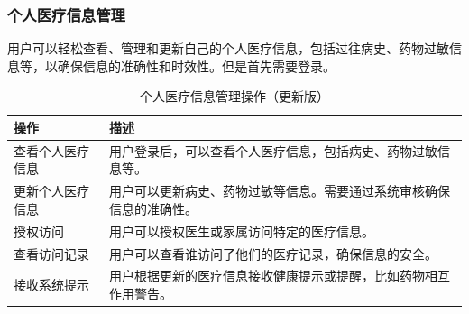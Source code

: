 \newpage
\subsubsection{个人医疗信息管理}
用户可以轻松查看、管理和更新自己的个人医疗信息，包括过往病史、药物过敏信息等，以确保信息的准确性和时效性。但是首先需要登录。

\begin{table}[htbp]
	\centering
	\begin{tabular}{|p{6cm}|p{6cm}|}
		\hline
		\textbf{操作} & \textbf{描述} \\
		\hline
		查看个人医疗信息 & 用户登录后，可以查看个人医疗信息，包括病史、药物过敏信息等。 \\
		更新个人医疗信息 & 用户可以更新病史、药物过敏等信息。需要通过系统审核确保信息的准确性。 \\
		授权访问 & 用户可以授权医生或家属访问特定的医疗信息。 \\
		查看访问记录 & 用户可以查看谁访问了他们的医疗记录，确保信息的安全。 \\
		接收系统提示 & 用户根据更新的医疗信息接收健康提示或提醒，比如药物相互作用警告。 \\
		\hline
	\end{tabular}
	\caption{个人医疗信息管理操作（更新版）}
\end{table}


